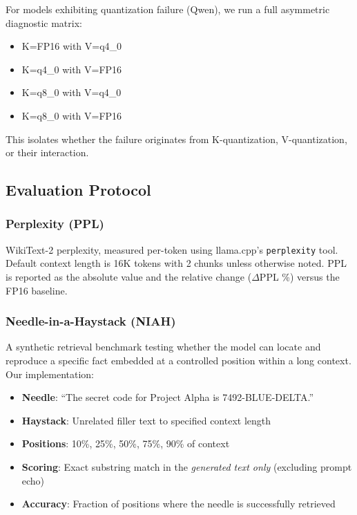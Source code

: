 For models exhibiting quantization failure (Qwen), we run a full asymmetric diagnostic matrix:
\begin{itemize}
    \item K=FP16 with V=q4\_0
    \item K=q4\_0 with V=FP16
    \item K=q8\_0 with V=q4\_0
    \item K=q8\_0 with V=FP16
\end{itemize}
This isolates whether the failure originates from K-quantization, V-quantization, or their interaction.

\subsection{Evaluation Protocol}

\subsubsection{Perplexity (PPL)}

WikiText-2 perplexity, measured per-token using llama.cpp's \texttt{perplexity} tool. Default context length is 16K tokens with 2 chunks unless otherwise noted. PPL is reported as the absolute value and the relative change ($\Delta$PPL \%) versus the FP16 baseline.

\subsubsection{Needle-in-a-Haystack (NIAH)}

A synthetic retrieval benchmark testing whether the model can locate and reproduce a specific fact embedded at a controlled position within a long context. Our implementation:

\begin{itemize}
    \item \textbf{Needle}: ``The secret code for Project Alpha is 7492-BLUE-DELTA.''
    \item \textbf{Haystack}: Unrelated filler text to specified context length
    \item \textbf{Positions}: 10\%, 25\%, 50\%, 75\%, 90\% of context
    \item \textbf{Scoring}: Exact substring match in the \emph{generated text only} (excluding prompt echo)
    \item \textbf{Accuracy}: Fraction of positions where the needle is successfully retrieved
\end{itemize}

